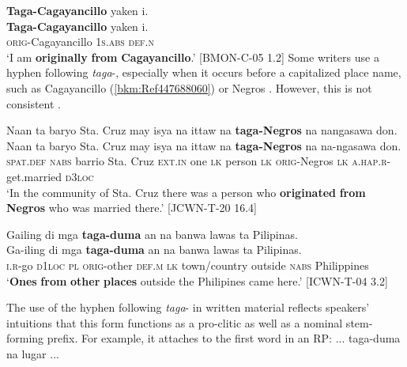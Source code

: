 \ea
\label{bkm:Ref447688060}
\textbf{Taga-Cagayancillo}  yaken  i. \\\smallskip
 \gll \textbf{Taga-Cagayancillo}  yaken  i. \\
\textsc{orig}-Cagayancillo  1\textsc{s.abs}  \textsc{def.n} \\
\glt ‘I am \textbf{originally} \textbf{from} \textbf{Cagayancillo}.’ [BMON-C-05 1.2]
\z
Some writers use a hyphen following \textit{taga}-, especially when it occurs before a capitalized place name, such as Cagayancillo (\ref{bkm:Ref447688060}) or Negros . However, this is not consistent .

\ea
\label{ex:negros}
Naan  ta  baryo  Sta. Cruz  may  isya  na  ittaw  na  \textbf{taga-Negros} na  nangasawa  don. \\\smallskip
 \gll Naan  ta  baryo  Sta. Cruz  may  isya  na  ittaw  na  \textbf{taga-Negros} na  na-ngasawa  don. \\
\textsc{spat.def}  \textsc{nabs}  barrio  Sta. Cruz  \textsc{ext.in}  one  \textsc{lk}  person  \textsc{lk}  \textsc{orig}-Negros
\textsc{lk}  \textsc{a.hap.r}-get.married  \textsc{d3loc} \\
\glt `In the community of Sta. Cruz there was a person who \textbf{originated} \textbf{from} \textbf{Negros} who was married there.’ [JCWN-T-20 16.4]
\z

\ea
\label{ex:philippines}
Gailing  di  mga  \textbf{taga-duma}  an  na  banwa  lawas  ta  Pilipinas. \\\smallskip
 \gll Ga-iling  di  mga  \textbf{taga-duma}  an  na  banwa  lawas  ta  Pilipinas. \\
\textsc{i.r}-go  \textsc{d}1\textsc{loc}  \textsc{pl}  \textsc{orig}-other  \textsc{def.m}  \textsc{lk}  town/country  outside  \textsc{nabs}  Philippines \\
\glt ‘\textbf{Ones} \textbf{from} \textbf{other} \textbf{places} outside the Philipines came here.’ [ICWN-T-04 3.2]
\z

The use of the hyphen following \textit{taga}- in written material reflects speakers' intuitions that this form functions as a pro-clitic as well as a nominal stem-forming prefix. For example, it attaches to the first word in an RP:
\ea
    \ea
    \label{ex:otherplaces}
    ... taga-duma na lugar ... \\\smallskip

